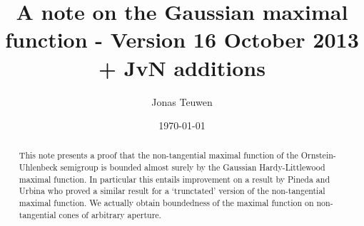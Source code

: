 \documentclass[a4paper,oneside,10pt]{amsproc}
\title[Gaussian maximal functions]{A note on the Gaussian maximal
  function - Version 16 October 2013 + JvN additions}
\author{Jonas Teuwen}%
\date{\today}
\theoremstyle{remark}
\begin{document}
\begin{abstract}
  This note presents a proof that 
  the non-tangential maximal function of the Ornstein-Uhlenbeck semigroup
  is bounded almost surely by the Gaussian Hardy-Littlewood maximal
  function.  In particular this entails improvement on a result by
  Pineda and Urbina \cite{Pineda2008} who proved a similar result for 
  a `trunctated' version of the non-tangential maximal function. 
  We actually obtain boundedness of the maximal function on non-tangential
  cones of arbitrary aperture.
\end{abstract}


\maketitle
\end{document}
